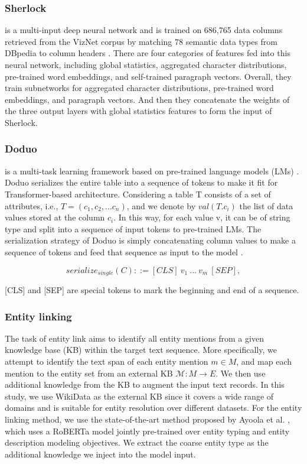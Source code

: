 \subsubsection{Sherlock} is a multi-input deep neural network and is trained on 686,765 data columns retrieved from the VizNet corpus by matching 78 semantic data types from DBpedia to column headers \cite{hulsebos_sherlock_2019}. There are four categories of features fed into this neural network, including global statistics, aggregated character distributions, pre-trained word embeddings, and self-trained paragraph vectors. Overall, they train subnetworks for aggregated character distributions, pre-trained word embeddings, and paragraph vectors. And then they concatenate the weights of the three output layers with global statistics features to form the input of Sherlock. 

\subsubsection{Doduo} is a multi-task learning framework based on pre-trained language models (LMs) \cite{suhara_annotating_2022}. Doduo serializes the entire table into a sequence of tokens to make it fit for Transformer-based architecture. Considering a table T consists of a set of attributes, i.e., $T= (c_1, c_2,... c_n)$, and we denote by  $val(T.c_i)$ the list of data values stored at the column $c_i$. In this way, for each value v, it can be of string type and split into a sequence of input tokens to pre-trained LMs. The serialization strategy of Doduo is simply concatenating column values to make a sequence of tokens and feed that sequence as input to the model \cite{suhara_annotating_2022}. 

\begin{equation}
    serialize_{single}(C) ::= [CLS]\ v_1\ ...\ v_m\ [SEP],
\end{equation}

[CLS] and [SEP] are special tokens to mark the beginning and end of a sequence. 


\subsubsection{Entity linking}
The task of entity link aims to identify all entity mentions from a given knowledge base (KB) within the target text sequence. More specifically, we attempt to identify the text span of each entity mention $m \in M$, and map each mention to the entity set from an external KB $\mathcal{M}: M \rightarrow E$. 
We then use additional knowledge from the KB to augment the input text records.
In this study, we use WikiData as the external KB since it covers a wide range of domains and is suitable for entity resolution over different datasets. For the entity linking method, we use the state-of-the-art method proposed by Ayoola et al. \cite{ayoola_refined_2022}, which uses a RoBERTa model jointly pre-trained over entity typing and entity description modeling objectives. We extract the coarse entity type as the additional knowledge we inject into the model input.

